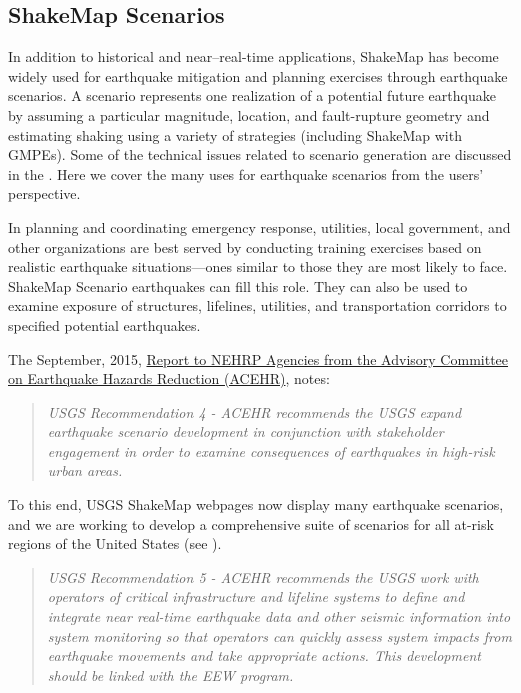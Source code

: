 \documentclass[letterpaper,10pt,english]{sphinxmanual}
\begin{document}
\subsection{ShakeMap Scenarios}
\label{shakemap_archives:sec-scenarios}\label{shakemap_archives:shakemap-scenarios}
In addition to historical and near--real-time applications, ShakeMap has become widely
used for earthquake mitigation and planning exercises through earthquake scenarios.
A scenario represents one realization of a potential future earthquake by assuming a
particular magnitude, location, and fault-rupture geometry and estimating shaking using a
variety of strategies (including ShakeMap with GMPEs).
Some of the technical issues related to scenario generation are discussed in the {\hyperref[technical_guide:technical\string-guide]{}}.
Here we cover the many uses for earthquake scenarios from the users' perspective.

In planning and coordinating emergency response, utilities, local government, and other
organizations are best served by conducting training exercises based on realistic
earthquake situations---ones similar to those they are most likely to face. ShakeMap
Scenario earthquakes can fill this role. They can also be used to examine
exposure of structures, lifelines, utilities, and transportation corridors to specified
potential earthquakes.

The September, 2015, \href{http://nehrp.gov/pdf/2015ACEHRReportFinal.pdf}{Report to NEHRP Agencies from the Advisory Committee on
Earthquake Hazards Reduction (ACEHR)},
notes:
\begin{quote}

\emph{USGS Recommendation 4 - ACEHR recommends the USGS expand earthquake scenario
development in conjunction with stakeholder engagement in order to examine
consequences of earthquakes in high-risk urban areas.}
\end{quote}

To this end, USGS ShakeMap webpages now display many earthquake scenarios, and
we are working to develop a comprehensive suite of scenarios for all at-risk
regions of the United States (see {\hyperref[references:thompson2016]{}}).
\begin{quote}

\emph{USGS Recommendation 5 - ACEHR recommends the USGS work with operators of
critical infrastructure and lifeline systems to define and integrate
near real-time earthquake data and other seismic information into
system monitoring so that operators can quickly assess system
impacts from earthquake movements
and take appropriate actions.  This development should be linked
with the EEW program.}
\end{quote}
\end{document}
